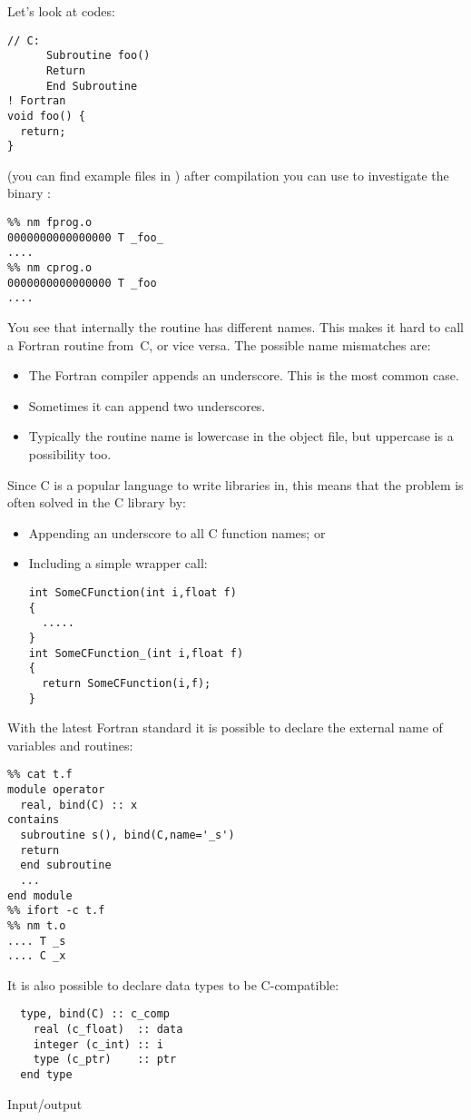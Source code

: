 Let's look at codes:
\begin{verbatim}
// C:
      Subroutine foo()
      Return
      End Subroutine
! Fortran
void foo() {
  return;
}
\end{verbatim}
(you can find example files in ) after compilation you can use 
 to investigate the binary :
\begin{verbatim}
%% nm fprog.o
0000000000000000 T _foo_
....
%% nm cprog.o
0000000000000000 T _foo
....
\end{verbatim}
You see that internally the  routine has different names. This makes
it hard to call a Fortran routine from~C, or vice versa.
The possible name mismatches are:
\begin{itemize}
\item The Fortran compiler appends an underscore. This is the most common case.
\item Sometimes it can append two underscores.
\item Typically the routine name is lowercase in the object file, but uppercase
      is a possibility too.
\end{itemize}

Since C is a popular language to write libraries in, this means
that the problem is often solved in the C library by:
\begin{itemize}
\item Appending an underscore to all C function names; or
\item Including a simple wrapper call:
\begin{verbatim}
int SomeCFunction(int i,float f)
{
  .....
}
int SomeCFunction_(int i,float f)
{
  return SomeCFunction(i,f);
}
\end{verbatim}
\end{itemize}

With the latest Fortran standard it is possible to declare the
external name of variables and routines:
\begin{verbatim}
%% cat t.f
module operator
  real, bind(C) :: x
contains
  subroutine s(), bind(C,name='_s')
  return
  end subroutine
  ...
end module
%% ifort -c t.f
%% nm t.o
.... T _s
.... C _x
\end{verbatim}

It is also possible to declare data types to be C-compatible:
\begin{verbatim}
  type, bind(C) :: c_comp
    real (c_float)  :: data
    integer (c_int) :: i
    type (c_ptr)    :: ptr
  end type
\end{verbatim}
 {Input/output}

